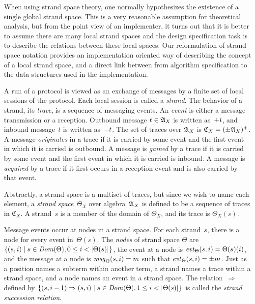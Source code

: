 \documentclass[12pt]{report}
\theoremstyle{definition}
\newcommand{\alga}{\alg{A}}
\newcommand{\tr}{\ensuremath{\mathfrak C}}
\newcommand{\sdom}{\fn{Dom}}
\newcommand{\evt}{\fn{evt}}
\newcommand{\msg}{\fn{msg}}
\begin{document}
When using strand space theory, one normally hypothesizes the
existence of a single global strand space.  This is a very reasonable
assumption for theoretical analysis, but from the point view of an
implementer, it turns out that it is better to assume there are many
local strand spaces and the design specification task is to describe
the relations between these local spaces.  Our reformulation of strand
space notation provides an implementation oriented way of describing
the concept of a local strand space, and a direct link between from
algorithm specification to the data structures used in the
implementation.

A run of a protocol is viewed as an exchange of messages by a finite
set of local sessions of the protocol.  Each local session is called a
\emph{strand}.  The behavior of a strand, its
\emph{trace}, is a sequence of messaging events.  An
\emph{event} is either a message transmission or a
reception.  Outbound message $t\in\alga_X$ is written as~$\mathord + t$,
and inbound message~$t$ is written as~$\mathord - t$.  The set of traces
over $\alga_X$ is $\tr_X=(\pm\alga_X)^+$.  A message
\emph{originates} in a trace if it is carried by
some event and the first event in which it is carried is outbound.  A
message is \emph{gained} by a trace if it is carried by
some event and the first event in which it is carried is inbound.  A
message is \emph{acquired} by a trace if it first
occurs in a reception event and is also carried by that event.

Abstractly, a strand space is a multiset of traces, but since we wish
to name each element, a \emph{strand
  space}~$\Theta_X$ over algebra~$\alga_X$ is defined to be a sequence
of traces in $\tr_X$.  A strand~$s$ is a member of the domain of
$\Theta_X$, and its trace is $\Theta_X(s)$.

Message events occur at nodes in a strand space.  For each strand~$s$,
there is a node for every event in~$\Theta(s)$.  The
\emph{nodes} of strand space $\Theta$ are $\{(s,i)\mid
s\in\sdom(\Theta), 0\leq i< |\Theta(s)|\}$, the event at a node is
\index{evt@\evt}$\evt_\Theta(s,i)=\Theta(s)(i)$, and the message at a
node is \index{msg@\msg}$\msg_\Theta(s,i) = m$ such that
$\evt_\Theta(s,i) = \pm m$.  Just as a position names a subterm within
another term, a strand names a trace within a strand space, and a node
names an event in a strand space.  The relation~$\Rightarrow$ defined
by $\{(s,i-1)\Rightarrow(s,i)\mid s\in\sdom(\Theta), 1\leq
i<|\Theta(s)|\}$ is called the \emph{strand
  succession relation}.
\end{document}
